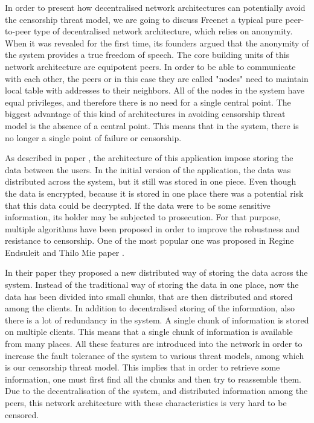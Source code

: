 In order to present how decentralised network architectures can potentially avoid the censorship threat model, we are going to discuss Freenet \cite{clarke2001} a typical pure peer-to-peer \cite{web:peertopeer} type of decentralised network architecture, which relies on anonymity.
When it was revealed for the first time, its founders argued that the anonymity of the system provides a true freedom of speech.
The core building units of this network architecture are equipotent peers.
In order to be able to communicate with each other, the peers or in this case they are called "nodes" need to maintain local table with addresses to their neighbors.
All of the nodes in the system have equal privileges, and therefore there is no need for a single central point.
The biggest advantage of this kind of architectures in avoiding censorship threat model is the absence of a central point.
This means that in the system, there is no longer a single point of failure or censorship.  

As described in paper \cite{clarke2001}, the architecture of this application impose storing the data between the users.
In the initial version of the application, the data was distributed across the system, but it still was stored in one piece.
Even though the data is encrypted, because it is stored in one place there was a potential risk that this data could be decrypted.
If the data were to be some sensitive information, its holder may be subjected to prosecution.
For that purpose, multiple algorithms have been proposed in order to improve the robustness and resistance to censorship.
One of the most popular one was proposed in Regine Endsuleit and Thilo Mie paper \cite{endsuleit2006}. 

In their paper they proposed a new distributed way of storing the data across the system.
Instead of the traditional way of storing the data in one place, now the data has been divided into small chunks, that are then distributed and stored among the clients.
In addition to decentralised storing of the information, also there is a lot of redundancy in the system.
A single chunk of information is stored on multiple clients.
This means that a single chunk of information is available from many places.
All these features are introduced into the network in order to increase the fault tolerance of the system to various threat models, among which is our censorship threat model.
This implies that in order to retrieve some information, one must first find all the chunks and then try to reassemble them.
Due to the decentralisation of the system, and distributed information among the peers, this network architecture with these characteristics is very hard to be censored.
